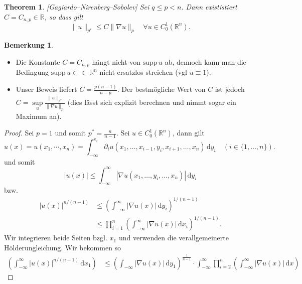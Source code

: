 \documentclass[
paper=a4,
bibtotocnumbered,
liststotocnumbered,
tablecaptionabove,
pointlessnumbers,
twoside,
openright,
10pt
]
{report}
\newcommand{\supp}{\mathrm{supp}\,}
\newtheorem{thm}{Theorem}[chapter]
\theoremstyle{definition}
\newtheorem*{rem}{Bemerkung}
\numberwithin{equation}{chapter}
\begin{document}
\begin{thm}\label{thm 3.1} [Gagiardo--Nirenberg--Sobolev]
	Sei $q\le p <n$. Dann exististiert $C=C_{n,p}\in \mathbb R$, so dass gilt
	\begin{equation}
	\|u\|_{p^*} \le C \| \nabla u\|_p \quad \forall u \in C_0^1(\mathbb R^n).
	\end{equation}
\end{thm}
\begin{rem}
 \begin{itemize}
	\item Die Konstante $C= C_{n,p}$ hängt nicht von $\supp u$ ab, dennoch kann man die Bedingung $\supp u\subset \subset \mathbb R^n$ nicht ersatzlos streichen (vgl $u\equiv 1$).
	\item Unser Beweis liefert $C= \frac{p(n-1)}{n-p}$. Der bestmögliche Wert von $C$ ist jedoch  $C= \sup\limits_u \frac{\|u\|_{p^*}}{\|\nabla u\|_p}$ (dies lässt sich explizit berechnen und nimmt sogar ein Maximum an).
 \end{itemize}
\end{rem}
\begin{proof}
	Sei $p=1$ und somit $p^*= \frac{n}{n-1}$. Sei $u\in C_0^1(\mathbb R^n)$, dann gilt 
	\begin{equation}
		u(x)=u(x_1, \cdots, x_n) = \int_{-\infty}^{x_i} \partial_i u(x_1, \ldots, x_{i-1}, y_i, x_{i+1}, \ldots, x_n) \, \mathrm dy_i \quad (i\in \{1, \ldots, n\}).
	\end{equation}
	und somit 
	\begin{equation}
		|u(x)| \le \int_{-\infty}^\infty | \nabla u(x_1, \ldots, y_i, \ldots, x_n)|\, \mathrm dy_i
	\end{equation}
	bzw.
	\begin{align}
		|u(x)|^{{n}/{(n-1)}} &\le \left ( \int_{-\infty}^\infty | \nabla u(x)|\, \mathrm dy_i\right ) ^{1/(n-1)}\\
		&\le \prod_{i=1}^n \left ( \int_{-\infty}^\infty |\nabla u(x)|\, \mathrm dx_i \right )^{1/(n-1)}.
	\end{align}
	Wir integrieren beide Seiten bzgl. $x_1$ und verwenden die verallgemeinerte Hölderungleichung. Wir bekommen so
	\begin{align}
		\left ( \int_{-\infty}^\infty | u(x)|^{n/(n-1)} \, \mathrm dx_1 \right ) &\le \left ( \int_{-\infty} |\nabla u(x)|\, \mathrm dy_1 \right )^{\frac{1}{n-1}} \cdot \int_{-\infty}^\infty \prod_{i=2}^n \left ( \int_{-\infty}^\infty | \nabla u(x)| \, \mathrm dx \right )
	\end{align}
\end{proof}
\end{document}
